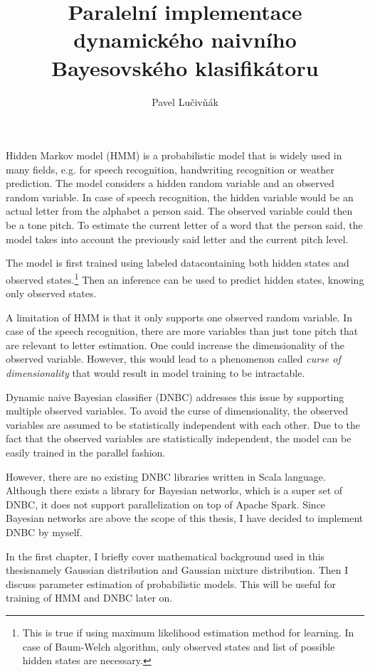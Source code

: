 \documentclass[thesis=B,english]{FITthesis}[2012/06/26]
\title{Paralelní implementace dynamického naivního Bayesovského klasifikátoru}
\author{Pavel Lučivňák} %
\begin{document}

\begin{introduction}
Hidden Markov model (HMM) is a probabilistic model that is widely used in many fields, e.g. for speech recognition, handwriting recognition or weather prediction. The model considers a hidden random variable and an observed random variable. In case of speech recognition, the hidden variable would be an actual letter from the alphabet a person said. The observed variable could then be a tone pitch. To estimate the current letter of a word that the person said, the model takes into account the previously said letter and the current pitch level.

The model is first trained using labeled data\textemdash containing both hidden states and observed states.\footnote{This is true if using maximum likelihood estimation method for learning. In case of Baum-Welch algorithm, only observed states and list of possible hidden states are necessary.} Then an inference can be used to predict hidden states, knowing only observed states.

A limitation of HMM is that it only supports one observed random variable. In case of the speech recognition, there are more variables than just tone pitch that are relevant to letter estimation. One could increase the dimensionality of the observed variable. However, this would lead to a phenomenon called \textit{curse of dimensionality} that would result in model training to be intractable.

Dynamic naive Bayesian classifier (DNBC) addresses this issue by supporting multiple observed variables. To avoid the curse of dimensionality, the observed variables are assumed to be statistically independent with each other. Due to the fact that the observed variables are statistically independent, the model can be easily trained in the parallel fashion.

However, there are no existing DNBC libraries written in Scala language. Although there exists a library for Bayesian networks, which is a super set of DNBC, it does not support parallelization on top of Apache Spark. Since Bayesian networks are above the scope of this thesis, I have decided to implement DNBC by myself.

In the first chapter, I briefly cover mathematical background used in this thesis\textemdash namely Gaussian distribution and Gaussian mixture distribution. Then I discuss parameter estimation of probabilistic models. This will be useful for training of HMM and DNBC later on.


\end{introduction}
\end{document}
